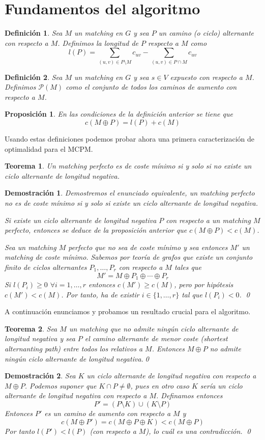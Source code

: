\documentclass[twoside,a4paper,openright,12pt,tikz]{book}
\newtheorem{defi}{Definici\'on}[section]
\newtheorem{prop}{Proposici\'on}[section]
\newtheorem{thm}{Teorema}[section]
\newtheorem*{dem}{Demostración}
\begin{document}
\section{Fundamentos del algoritmo}
\begin{defi}
Sea $M$ un matching en $G$ y sea $P$ un camino (o ciclo) alternante con respecto a $M$. Definimos la longitud de $P$ respecto a $M$ como
$$
l(P) = \sum_{(u,v)\in P\setminus M}c_{uv} - \sum_{(u,v)\in P\cap M}c_{uv}
$$
\end{defi}
\begin{defi}
Sea $M$ un matching en $G$ y sea $s\in V$ expuesto con respecto a $M$. Definimos $\mathcal{P}(M)$ como el conjunto de todos los caminos de aumento con respecto a $M$.
\end{defi}
\begin{prop}
En las condiciones de la definición anterior se tiene que
$$
c(M\oplus P) = l(P) + c(M)
$$
\end{prop}

Usando estas definiciones podemos probar ahora una primera caracterización de optimalidad para el MCPM.
\begin{thm}
Un matching perfecto es de coste mínimo si y solo si no existe un ciclo alternante de longitud negativa.
\end{thm}
\begin{dem}
Demostremos el enunciado equivalente, un matching perfecto no es de coste mínimo si y solo si existe un ciclo alternante de longitud negativa.

Si existe un ciclo alternante de longitud negativa $P$ con respecto a un matching $M$ perfecto, entonces se deduce de la proposición anterior que $c(M\oplus P) < c(M)$. 

Sea un matching $M$ perfecto que no sea de coste mínimo y sea entonces $M'$ un matching de coste mínimo. Sabemos por teoría de grafos que existe un conjunto finito de ciclos alternantes $P_1,\dotsc,P_r$ con respecto a $M$ tales que
$$
M' = M \oplus P_1 \oplus \cdots \oplus P_r
$$
Si $l(P_i) \geq 0$ $\forall i=1,\dotsc, r$ entonces $c(M') \geq c(M)$, pero por hipótesis $c(M')<c(M)$. Por tanto, ha de existir $i \in \{1,\dotsc,r\}$ tal que $l(P_i)<0$. \qed
\end{dem}
A continuación enunciamos y probamos un resultado crucial para el algoritmo.
\begin{thm}
Sea $M$ un matching que no admite ningún ciclo alternante de longitud negativa y sea $P$ el camino alternante de menor coste (\textit{shortest alternanting path}) entre todos los relativos a $M$. Entonces $M\oplus P$ no admite ningún ciclo alternante de longitud negativa.\qed
\end{thm}
\begin{dem}
Sea $K$ un ciclo alternante de longitud negativa con respecto a $M\oplus P$. Podemos suponer que $K\cap P \neq \emptyset$, pues en otro caso $K$ sería un ciclo alternante de longitud negativa con respecto a $M$. Definamos entonces
$$
P' = (P\setminus K)\cup (K\setminus P)
$$
Entonces $P'$ es un camino de aumento con respecto a $M$ y
$$
c(M \oplus P') = c(M \oplus P \oplus K) < c(M \oplus P)
$$
Por tanto $l(P')<l(P)$ (con respecto a $M$), lo cuál es una contradicción.
\qed
\end{dem}
\end{document}
